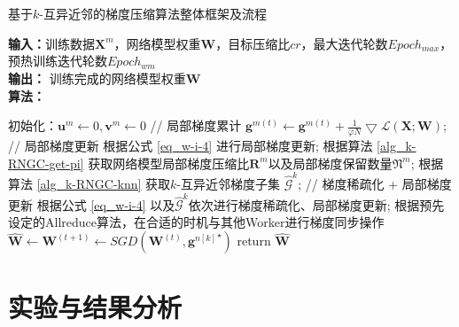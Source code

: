 \documentclass{xdupgthesis}
\begin{document}
\renewcommand{\arraystretch}{1.3}
\begin{algorithm}[ht]
    \caption{基于$k$-互异近邻的梯度压缩算法整体框架及流程}
    \label{alg_k-RNGC}
    \raggedright
    \hspace*{0.02in} \textbf{输入：}训练数据$\mathbf{X}^{m}$，网络模型权重$\mathbf{W}$，目标压缩比$cr$，最大迭代轮数$Epoch_{max}$，预热训练迭代轮数$Epoch_{wm}$ \\
    \hspace*{0.02in} \textbf{输出：} 训练完成的网络模型权重$\mathbf{\hat{W}}$ \\
    \hspace*{0.02in} \textbf{算法：} \\
    \begin{algorithmic}[1]
        \State 初始化：$\mathbf{u}^{m} \leftarrow 0, \mathbf{v}^{m} \leftarrow 0$
            \State // 局部梯度累计
                \State $\mathbf{g}^{m(t)} \leftarrow \mathbf{g}^{m(t)} + \frac{1}{\varphi N}\bigtriangledown \mathcal{L} \left(\mathbf{X}; \mathbf{W}\right)$;
            \EndFor
                \State // 局部梯度更新
                \State 根据公式 \eqref{eq_w-i-4} 进行局部梯度更新; 
            \Else
                \State 根据算法 \ref{alg_k-RNGC-get-pi} 获取网络模型局部梯度压缩比$\mathbf{R}^{m}$以及局部梯度保留数量$\mathfrak{N}^{m}$;
                \State 根据算法 \ref{alg_k-RNGC-knn} 获取$k$-互异近邻梯度子集 $\hat{\mathcal{G}}^{k}$;
                \State // 梯度稀疏化 + 局部梯度更新
                \State 根据公式 \eqref{eq_w-i-4} 以及$\hat{\mathcal{G}}^{k}$依次进行梯度稀疏化、局部梯度更新; 
            \EndIf
            \State 根据预先设定的Allreduce算法，在合适的时机与其他Worker进行梯度同步操作
            \State $\mathbf{\hat{W}} \leftarrow \mathbf{W}^{(t+1)} \leftarrow SGD\left( \mathbf{W}^{(t)}, {\mathbf{g}^{n[k]}}^{\star} \right)$
        \EndFor
        \State return $\mathbf{\hat{W}}$
    \end{algorithmic}
\end{algorithm}


\section{实验与结果分析}
\label{sec_chapter4-Exper}
\end{document}
